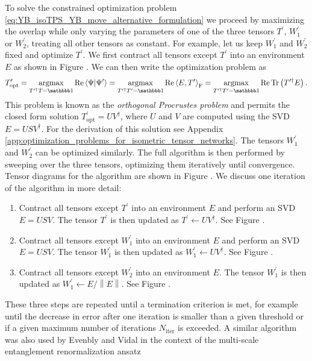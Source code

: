To solve the constrained optimization problem \eqref{eq:YB_isoTPS_YB_move_alternative_formulation} we proceed by maximizing the overlap while only varying the parameters of one of the three tensors $T^\prime$, $W_1^\prime$ or $W_2^\prime$, treating all other tensors as constant. For example, let us keep $W_1^\prime$ and $W_2^\prime$ fixed and optimize $T^\prime$. We first contract all tensors except $T^\prime$ into an environment $E$ as shown in Figure . We can then write the optimization problem as
\begin{equation}
	T^\prime_\text{opt} = \underset{T^{\prime\dagger}T = \id}{\argmax} \Re\braket{\Psi|\Psi^\prime} = \underset{T^{\prime\dagger}T^\prime = \id}{\argmax}\Re\left\langle E, T^\prime\right\rangle_\text{F} = \underset{T^{\prime\dagger}T^\prime = \id}{\argmax}\Re\Tr\left(T^{\prime\dagger}E\right).
\end{equation}
This problem is known as the \textit{orthogonal Procrustes problem} and permits the closed form solution $T^\prime_\text{opt} = UV^\dagger$, where $U$ and $V$ are computed using the SVD $E = USV^\dagger$. For the derivation of this solution see Appendix \ref{app:optimization_problems_for_isometric_tensor_networks}. The tensors $W_1^\prime$ and $W_2^\prime$ can be optimized similarly. The full algorithm is then performed by sweeping over the three tensors, optimizing them iteratively until convergence. Tensor diagrams for the algorithm are shown in Figure . We discuss one iteration of the algorithm in more detail:
\begin{enumerate}
	\item Contract all tensors except $T^\prime$ into an environment $E$ and perform an SVD $E = USV$. The tensor $T^\prime$ is then updated as $T^\prime\leftarrow UV^\dagger$. See Figure .
	\item Contract all tensors except $W_1^\prime$ into an environment $E$ and perform an SVD $E = USV$. The tensor $W_1^\prime$ is then updated as $W_1^\prime\leftarrow UV^\dagger$. See Figure .
	\item Contract all tensors except $W_2^\prime$ into an environment $E$. The tensor $W_1^\prime$ is then updated as $W_1^\prime\leftarrow E/\left\lVert E\right\rVert$. See Figure .
\end{enumerate}
These three steps are repeated until a termination criterion is met, for example until the decrease in error after one iteration is smaller than a given threshold or if a given maximum number of iterations $N_\text{iter}$ is exceeded. A similar algorithm was also used by Evenbly and Vidal in the context of the multi-scale entanglement renormalization ansatz
